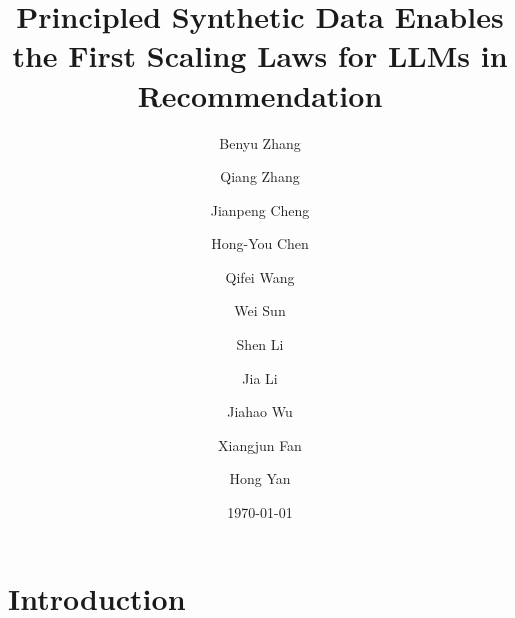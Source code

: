 \documentclass[]{fairmeta}
\title{Principled Synthetic Data Enables the First Scaling Laws for LLMs in Recommendation}
\author[1]{Benyu Zhang}
\author[1]{Qiang Zhang}
\author[]{Jianpeng Cheng}
\author[]{Hong-You Chen}
\author[]{Qifei Wang}
\author[]{Wei Sun}
\author[]{Shen Li}
\author[]{Jia Li}
\author[]{Jiahao Wu}
\author[]{Xiangjun Fan}
\author[]{Hong Yan}
\affiliation[1]{Equal contributions}
\date{\today}
\newcommand{\jh}[1]{\iftoggle{comment}{\textcolor{orange}{[JH: #1]}}{}}
\newcommand{\qiang}[1]{\iftoggle{comment}{\textcolor{red}{Qiang: #1}}{}}
\begin{document}
\maketitle

\section{Introduction}
\end{document}
